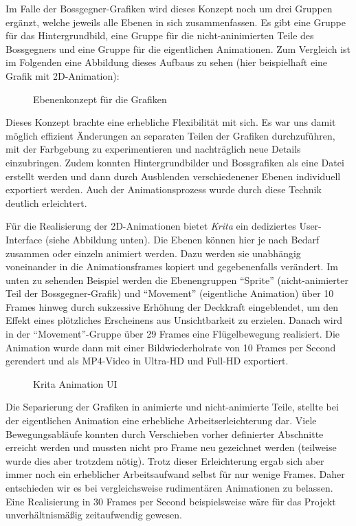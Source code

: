 Im Falle der Bossgegner-Grafiken wird dieses Konzept noch um drei Gruppen ergänzt, welche jeweils alle Ebenen in sich zusammenfassen. Es gibt eine Gruppe für das Hintergrundbild, eine Gruppe für die nicht-aninimierten Teile des Bossgegners und eine Gruppe für die eigentlichen Animationen.
Zum Vergleich ist im Folgenden eine Abbildung dieses Aufbaus zu sehen (hier beispielhaft eine Grafik mit 2D-Animation):

\begin{figure}[H]
    \centering
    \caption{Ebenenkonzept für die Grafiken}
    \label{fig:krita_layer_example}
\end{figure}

Dieses Konzept brachte eine erhebliche Flexibilität mit sich. Es war uns damit möglich effizient Änderungen an separaten Teilen der Grafiken durchzuführen, mit der Farbgebung zu experimentieren und nachträglich neue Details einzubringen. Zudem konnten Hintergrundbilder und Bossgrafiken als eine Datei erstellt werden und dann durch Ausblenden verschiedenener Ebenen individuell exportiert werden. Auch der Animationsprozess wurde durch diese Technik deutlich erleichtert. 

Für die Realisierung der 2D-Animationen bietet \textit{Krita} ein dediziertes User-Interface (siehe Abbildung unten). Die Ebenen können hier je nach Bedarf zusammen oder einzeln animiert werden. Dazu werden sie unabhängig voneinander in die Animationsframes kopiert und gegebenenfalls verändert. Im unten zu sehenden Beispiel werden die Ebenengruppen \enquote{Sprite} (nicht-animierter Teil der Bossgegner-Grafik) und \enquote{Movement} (eigentliche Animation) über 10 Frames hinweg durch sukzessive Erhöhung der Deckkraft eingeblendet, um den Effekt eines plötzliches Erscheinens aus Unsichtbarkeit zu erzielen. Danach wird in der \enquote{Movement}-Gruppe über 29 Frames eine Flügelbewegung realisiert. Die Animation wurde dann mit einer Bildwiederholrate von 10 Frames per Second gerendert und als MP4-Video in Ultra-HD und Full-HD exportiert. 

\begin{figure}[H]
    \centering
    \caption{Krita Animation UI}
    \label{fig:krita_animation_example}
\end{figure}

Die Separierung der Grafiken in animierte und nicht-animierte Teile, stellte bei der eigentlichen Animation eine erhebliche Arbeitserleichterung dar. Viele Bewegungsabläufe konnten durch Verschieben vorher definierter Abschnitte erreicht werden und mussten nicht pro Frame neu gezeichnet werden (teilweise wurde dies aber trotzdem nötig). Trotz dieser Erleichterung ergab sich aber immer noch ein erheblicher Arbeitsaufwand selbst für nur wenige Frames. Daher entschieden wir es bei vergleichsweise rudimentären Animationen zu belassen. Eine Realisierung in 30 Frames per Second beispielsweise wäre für das Projekt unverhältnismäßig zeitaufwendig gewesen.


